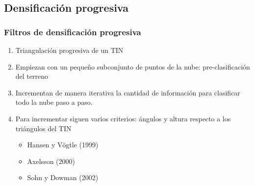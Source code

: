 \subsection{Densificación progresiva}
\begin{frame}
  \frametitle{Filtros de densificación progresiva}
  \begin{enumerate}
    \item Triangulación progresiva de un TIN 
    \item Empiezan con un pequeño subconjunto de puntos de la nube: pre-clasificación del terreno
    \item Incrementan de manera iterativa la cantidad de información para
      clasificar todo la nube paso a paso.
    \item Para incrementar siguen varios criterios: ángulos y altura respecto a
      los triángulos del TIN
      \begin{itemize}
        \item Hansen y Vögtle (1999)
        \item Axelsson (2000)
        \item Sohn y Dowman (2002)
      \end{itemize}
  \end{enumerate}
\end{frame}

